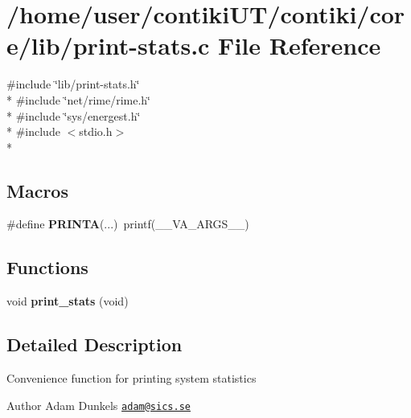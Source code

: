 \hypertarget{print-stats_8c}{}\section{/home/user/contiki\+U\+T/contiki/core/lib/print-\/stats.c File Reference}
\label{print-stats_8c}
{\ttfamily \#include \char`\"{}lib/print-\/stats.\+h\char`\"{}}\\*
{\ttfamily \#include \char`\"{}net/rime/rime.\+h\char`\"{}}\\*
{\ttfamily \#include \char`\"{}sys/energest.\+h\char`\"{}}\\*
{\ttfamily \#include $<$stdio.\+h$>$}\\*
\subsection*{Macros}
\begin{DoxyCompactItemize}
\item 
\hypertarget{print-stats_8c_a5daba8b510f6791c58062d6c847ccfbb}{}\#define {\bfseries P\+R\+I\+N\+T\+A}(...)~printf(\+\_\+\+\_\+\+V\+A\+\_\+\+A\+R\+G\+S\+\_\+\+\_\+)\label{print-stats_8c_a5daba8b510f6791c58062d6c847ccfbb}

\end{DoxyCompactItemize}
\subsection*{Functions}
\begin{DoxyCompactItemize}
\item 
\hypertarget{print-stats_8c_a3cfd081470c98af274220427883690c2}{}void {\bfseries print\+\_\+stats} (void)\label{print-stats_8c_a3cfd081470c98af274220427883690c2}

\end{DoxyCompactItemize}


\subsection{Detailed Description}
Convenience function for printing system statistics \begin{DoxyAuthor}{Author}
Adam Dunkels \href{mailto:adam@sics.se}{\tt adam@sics.\+se} 
\end{DoxyAuthor}
